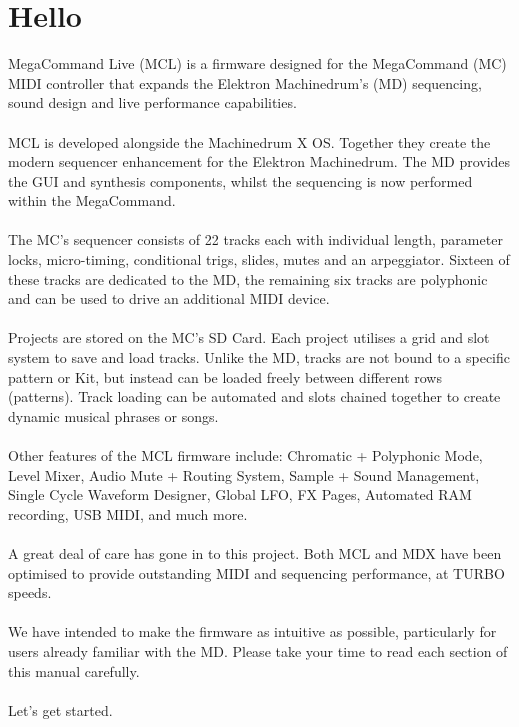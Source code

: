 \section{Hello}
MegaCommand Live (MCL) is a firmware designed for the MegaCommand (MC) MIDI controller that expands the Elektron Machinedrum's (MD) sequencing, sound design and live performance capabilities. 
\\
\\
MCL is developed alongside the Machinedrum X OS. Together they create the modern sequencer enhancement for the Elektron Machinedrum. The MD provides the GUI and synthesis components, whilst the sequencing is now performed within the MegaCommand.
\\
\\
The MC's sequencer consists of 22 tracks each with individual length, parameter locks, micro-timing, conditional trigs, slides, mutes and an arpeggiator. Sixteen of these tracks are dedicated to the MD, the remaining six tracks are polyphonic and can be used to drive an additional MIDI device.
\\
\\
Projects are stored on the MC's SD Card. Each project utilises a grid and slot system to save and load tracks. Unlike the MD, tracks are not bound to a specific pattern or Kit, but instead can be loaded freely between different rows (patterns). Track loading can be automated and slots chained together to create dynamic musical phrases or songs. 
\\
\\
Other features of the MCL firmware include: Chromatic + Polyphonic Mode,  Level Mixer, Audio Mute + Routing System, Sample + Sound Management, Single Cycle Waveform Designer, Global LFO, FX Pages, Automated RAM recording, USB MIDI, and much more.
\\
\\
A great deal of care has gone in to this project. Both MCL and MDX have been optimised to provide outstanding MIDI and sequencing performance, at TURBO speeds.
\\
\\
We have intended to make the firmware as intuitive as possible, particularly for users already familiar with the MD. Please take your time to read each section of this manual carefully. 
\\
\\
Let's get started.